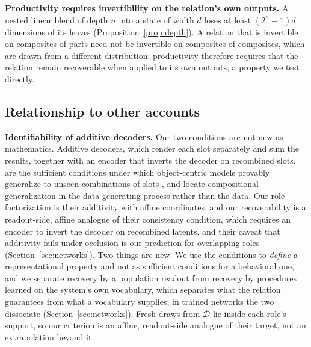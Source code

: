 \documentclass[10pt]{article}
\theoremstyle{plain}
\theoremstyle{remark}
\newcommand{\D}{\mathcal{D}}
\begin{document}
\textbf{Productivity requires invertibility on the relation's own outputs.} A nested linear blend of depth $n$ into a state of width $d$ loses at least $(2^n - 1)d$ dimensions of its leaves (Proposition~\ref{prop:depth}). A relation that is invertible on composites of parts need not be invertible on composites of composites, which are drawn from a different distribution; productivity therefore requires that the relation remain recoverable when applied to its own outputs, a property we test directly.

\subsection{Relationship to other accounts}
\label{sec:related}

\textbf{Identifiability of additive decoders.} Our two conditions are not new as mathematics. Additive decoders, which render each slot separately and sum the results, together with an encoder that inverts the decoder on recombined slots, are the sufficient conditions under which object-centric models provably generalize to unseen combinations of slots \citep{brady2023,lachapelle2023,wiedemer2024}, and \citet{wiedemer2023} locate compositional generalization in the data-generating process rather than the data. Our role-factorization is their additivity with affine coordinates, and our recoverability is a readout-side, affine analogue of their consistency condition, which requires an encoder to invert the decoder on recombined latents, and their caveat that additivity fails under occlusion is our prediction for overlapping roles (Section~\ref{sec:networks}). Two things are new. We use the conditions to \emph{define} a representational property and not as sufficient conditions for a behavioral one, and we separate recovery by a population readout from recovery by procedures learned on the system's own vocabulary, which separates what the relation guarantees from what a vocabulary supplies; in trained networks the two dissociate (Section~\ref{sec:networks}). Fresh draws from $\D$ lie inside each role's support, so our criterion is an affine, readout-side analogue of their target, not an extrapolation beyond it.
\end{document}

